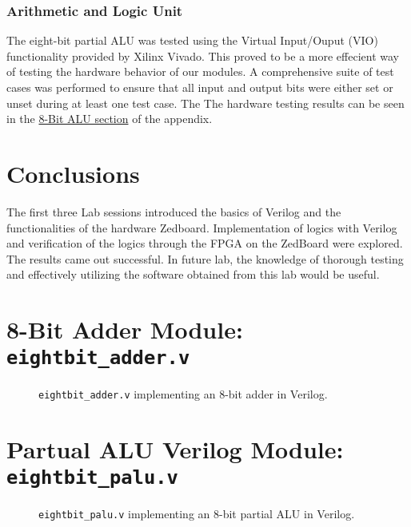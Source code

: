 \documentclass[12pt, letterpaper]{article}
\begin{document}
\subsubsection{Arithmetic and Logic Unit}
The eight-bit partial ALU was tested using the Virtual Input/Ouput (VIO) functionality provided by Xilinx Vivado.  This proved to be a more effecient way of testing the hardware behavior of our modules.  A comprehensive suite of test cases was performed to ensure that all input and output bits were either set or unset during at least one test case.  The The hardware testing results can be seen in the \hyperref[lab3_hardware]{8-Bit ALU section} of the appendix.




\newpage
\section{Conclusions}
The first three Lab sessions introduced the basics of Verilog and the functionalities of the hardware Zedboard. Implementation of logics with Verilog and verification of the logics through the FPGA on the ZedBoard were explored. The results came out successful. In future lab, the knowledge of thorough testing and effectively utilizing the software obtained from this lab would be useful.  




\newpage
\appendix
\appendixpage
\addappheadtotoc 


\section{8-Bit Adder Module: \texttt{eightbit\_adder.v}} \label{eightbit_adder_module}
\FloatBarrier
\begin{figure}[h]
	
	\caption{\texttt{eightbit\_adder.v} implementing an 8-bit adder in Verilog.}
\end{figure}
\FloatBarrier


\newpage
\section{Partual ALU Verilog Module: \texttt{eightbit\_palu.v}} \label{eightbit_partial_alu_module}
\FloatBarrier
\begin{figure}[h]
	
	\caption{\texttt{eightbit\_palu.v} implementing an 8-bit partial ALU in Verilog.}
\end{figure}
\FloatBarrier
\end{document}

